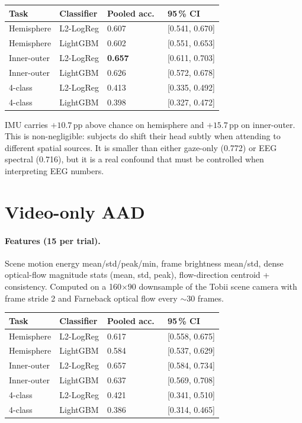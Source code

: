 \begin{table}[ht]
\centering
\begin{tabular}{llll}
\toprule
Task & Classifier & Pooled acc.\ & 95\,\% CI \\
\midrule
Hemisphere   & L2-LogReg & 0.607 & [0.541, 0.670] \\
Hemisphere   & LightGBM  & 0.602 & [0.551, 0.653] \\
Inner-outer  & L2-LogReg & \textbf{0.657} & [0.611, 0.703] \\
Inner-outer  & LightGBM  & 0.626 & [0.572, 0.678] \\
4-class      & L2-LogReg & 0.413 & [0.335, 0.492] \\
4-class      & LightGBM  & 0.398 & [0.327, 0.472] \\
\bottomrule
\end{tabular}
\end{table}

\noindent
IMU carries $+10.7$\,pp above chance on hemisphere and $+15.7$\,pp on
inner-outer. This is non-negligible: subjects do shift their head
subtly when attending to different spatial sources. It is smaller than
either gaze-only (0.772) or EEG spectral (0.716), but it is a real
confound that must be controlled when interpreting EEG numbers.

\section{Video-only AAD}

\paragraph{Features (15 per trial).} Scene motion energy mean/std/peak/min,
frame brightness mean/std, dense optical-flow magnitude stats (mean, std,
peak), flow-direction centroid + consistency. Computed on a
160$\times$90 downsample of the Tobii scene camera with frame stride 2
and Farneback optical flow every $\sim\!30$ frames.

\begin{table}[ht]
\centering
\begin{tabular}{llll}
\toprule
Task & Classifier & Pooled acc.\ & 95\,\% CI \\
\midrule
Hemisphere   & L2-LogReg & 0.617 & [0.558, 0.675] \\
Hemisphere   & LightGBM  & 0.584 & [0.537, 0.629] \\
Inner-outer  & L2-LogReg & 0.657 & [0.584, 0.734] \\
Inner-outer  & LightGBM  & 0.637 & [0.569, 0.708] \\
4-class      & L2-LogReg & 0.421 & [0.341, 0.510] \\
4-class      & LightGBM  & 0.386 & [0.314, 0.465] \\
\bottomrule
\end{tabular}
\end{table}

